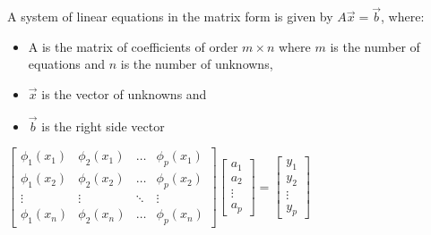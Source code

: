 \documentclass{article}
\begin{document}
\begin{multicols}{2}
A system of linear equations in the matrix form is given by $A\vec{x} = \vec{b}$,
where:
\begin{itemize}
    \setlength\itemsep{0.1em}
    \item A is the matrix of coefficients of order $m \times n$ where $m$ is the number of equations
        and $n$ is the number of unknowns,
    \item $\vec{x}$ is the vector of unknowns and
    \item $\vec{b}$ is the right side vector
\end{itemize}
\begin{small}
    \begin{center}
        \begin{math}
        \begin{bmatrix}
            \phi_1(x_1) & \phi_2(x_1) & \dots  & \phi_p(x_1) \\
            \phi_1(x_2) & \phi_2(x_2) & \dots  & \phi_p(x_2) \\
            \vdots & \vdots & \ddots & \vdots \\
            \phi_1(x_n) & \phi_2(x_n) & \dots  & \phi_p(x_n)
        \end{bmatrix}
        \begin{bmatrix}
             a_1 \\
             a_2 \\
             \vdots \\
             a_p
        \end{bmatrix} = 
        \begin{bmatrix}
             y_1 \\
             y_2 \\
             \vdots \\
             y_p
        \end{bmatrix}
        \end{math}
    \end{center}
\end{small}


\end{multicols}
\end{document}
